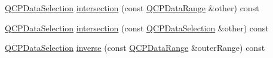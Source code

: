 \begin{DoxyCompactItemize}
\item 
\mbox{\hyperlink{class_q_c_p_data_selection}{Q\+C\+P\+Data\+Selection}} \mbox{\hyperlink{class_q_c_p_data_selection_af5267ced53687561367105ee77b874ab}{intersection}} (const \mbox{\hyperlink{class_q_c_p_data_range}{Q\+C\+P\+Data\+Range}} \&other) const
\item 
\mbox{\hyperlink{class_q_c_p_data_selection}{Q\+C\+P\+Data\+Selection}} \mbox{\hyperlink{class_q_c_p_data_selection_af296ec5a948656c1d1ecb7b2970d2a24}{intersection}} (const \mbox{\hyperlink{class_q_c_p_data_selection}{Q\+C\+P\+Data\+Selection}} \&other) const
\item 
\mbox{\hyperlink{class_q_c_p_data_selection}{Q\+C\+P\+Data\+Selection}} \mbox{\hyperlink{class_q_c_p_data_selection_ae8097f4e4ffee7b1b5df27c93eb365db}{inverse}} (const \mbox{\hyperlink{class_q_c_p_data_range}{Q\+C\+P\+Data\+Range}} \&outer\+Range) const
\end{DoxyCompactItemize}
